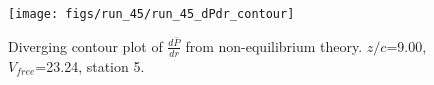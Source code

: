 \begin{figure}[H]
\centering
\texttt{[image: figs/run\_45/run\_45\_dPdr\_contour]}
\caption{Diverging contour plot of $\frac{d\bar{P}}{dr}$ from non-equilibrium theory. $z/c$=9.00, $V_{free}$=23.24, station 5.}
\label{fig:run_45_dPdr_contour}
\end{figure}


